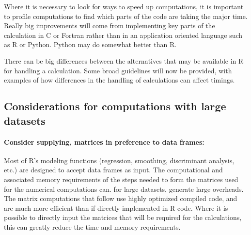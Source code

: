 Where
it is necessary to look for ways to speed up computations, it is
important to profile computations to find which parts of the code
are taking the major time.  Really big improvements will come from
implementing key parts of the calculation in C or Fortran rather than
in an application oriented language such as R or Python.  Python may
do somewhat better than R.

There can be big differences between the alternatives that may be
available in R for handling a calculation. Some broad guidelines will
now be provided, with examples of how differences in the handling of
calculations can affect timings.

\subsection{Considerations for computations with large datasets}

\paragraph{Consider supplying, matrices in preference to data frames:}

Most of R's modeling functions (regression, smoothing, discriminant
analysis, etc.) are designed to accept data frames as input. The
computational and associated memory requirements of the steps
needed to form the matrices used for the numerical computations
can. for large datasets, generate large overheads.  The matrix 
computations that follow use highly optimized compiled code, 
and are much more efficient than if directly implemented in R code.
Where it is possible to directly input the matrices that will be
required for the calculations, this can greatly reduce the time
and memory requirements.

